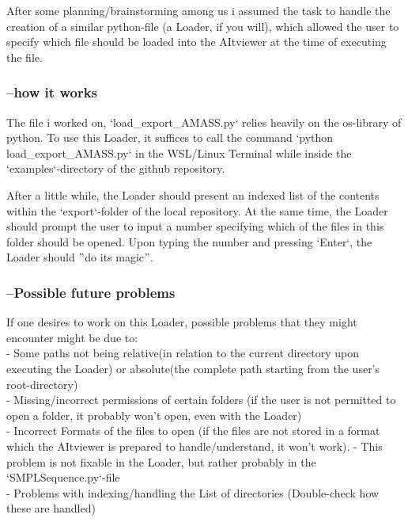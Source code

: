 \documentclass[a4paper]{scrartcl}
\begin{document}
\quad After some planning/brainstorming among us i assumed the task to handle the creation of a similar python-file (a Loader, if you will), which allowed the user to specify which file should be loaded into the AItviewer at the time of executing the file.

\subsubsection*{--how it works}
\quad The file i worked on, `load\_export\_AMASS.py` relies heavily on the os-library of python.
To use this Loader, it suffices to call the command `python load\_export\_AMASS.py` in the WSL/Linux Terminal while inside the `examples`-directory of the github repository.


\quad After a little while, the Loader should present an indexed list of the contents within the `export`-folder of the local repository. At the same time, the Loader should prompt the user to input a number specifying which of the files in this folder should be opened. Upon typing the number and pressing `Enter`, the Loader should $"$do its magic$"$.

\subsubsection*{--Possible future problems}
If one desires to work on this Loader, possible problems that they might encounter might be due to:\\
- Some paths not being relative(in relation to the current directory upon executing the Loader) or absolute(the complete path starting from the user's root-directory)\\
- Missing/incorrect permissions of certain folders (if the user is not permitted to open a folder, it probably won't open, even with the Loader)\\
- Incorrect Formats of the files to open (if the files are not stored in a format which the AItviewer is prepared to handle/understand, it won't work). - This problem is not fixable in the Loader, but rather probably in the `SMPLSequence.py`-file\\
- Problems with indexing/handling the List of directories (Double-check how these are handled)\\
\end{document}
